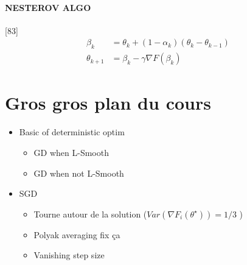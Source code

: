 \documentclass{article}
\theoremstyle{plain}%
\theoremstyle{definition}
\theoremstyle{remark}
\begin{document}
\paragraph*{NESTEROV ALGO}[83]
\begin{align*}
    \beta _k &= \theta _k + (1 - \alpha _k) (\theta _k - \theta _{k-1}) \\
    \theta _{k+1} &= \beta _k - \gamma \nabla F(\beta _k)
\end{align*}

\section{Gros gros plan du cours}
\begin{itemize}
    \item Basic of deterministic optim
    \begin{itemize}
        \item GD when L-Smooth
        \item GD when not L-Smooth
    \end{itemize}
    \item SGD \begin{itemize}
        \item Tourne autour de la solution ($ Var(\nabla F_i(\theta ^\star )) = 1/3 $ ) 
        \item Polyak averaging fix ça 
        \item Vanishing step size 
    \end{itemize}
\end{itemize}
\end{document}
